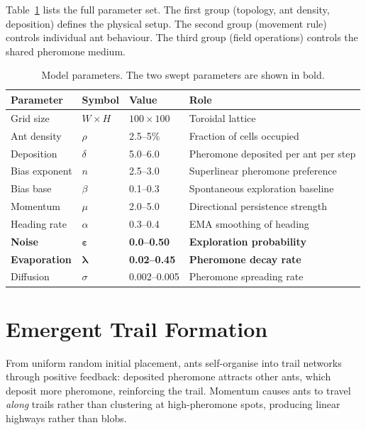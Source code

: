 \documentclass[11pt,a4paper]{article}
\begin{document}
Table~\ref{tab:params} lists the full parameter set.
The first group (topology, ant density, deposition) defines the physical setup.
The second group (movement rule) controls individual ant behaviour.
The third group (field operations) controls the shared pheromone medium.

\begin{table}[H]
\centering
\caption{Model parameters. The two swept parameters are shown in bold.}
\label{tab:params}
\begin{tabular}{@{}llll@{}}
\toprule
Parameter & Symbol & Value & Role \\
\midrule
Grid size & $W \times H$ & $100 \times 100$ & Toroidal lattice \\
Ant density & $\rho$ & 2.5--5\% & Fraction of cells occupied \\
Deposition & $\delta$ & 5.0--6.0 & Pheromone deposited per ant per step \\
\midrule
Bias exponent & $n$ & 2.5--3.0 & Superlinear pheromone preference \\
Bias base & $\beta$ & 0.1--0.3 & Spontaneous exploration baseline \\
Momentum & $\mu$ & 2.0--5.0 & Directional persistence strength \\
Heading rate & $\alpha$ & 0.3--0.4 & EMA smoothing of heading \\
\textbf{Noise} & $\boldsymbol{\varepsilon}$ & \textbf{0.0--0.50} & \textbf{Exploration probability} \\
\midrule
\textbf{Evaporation} & $\boldsymbol{\lambda}$ & \textbf{0.02--0.45} & \textbf{Pheromone decay rate} \\
Diffusion & $\sigma$ & 0.002--0.005 & Pheromone spreading rate \\
\bottomrule
\end{tabular}
\end{table}

\section{Emergent Trail Formation}

From uniform random initial placement, ants self-organise into trail networks through positive feedback: deposited pheromone attracts other ants, which deposit more pheromone, reinforcing the trail.
Momentum causes ants to travel \emph{along} trails rather than clustering at high-pheromone spots, producing linear highways rather than blobs.
\end{document}
